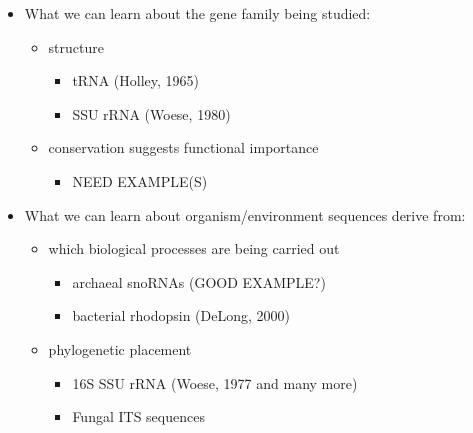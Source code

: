 \documentclass[landscape]{slides}
\begin{document}
\begin{slide}


\small
\begin{itemize}
\item What we can learn about the gene family being studied:
  \begin{itemize}
  \item structure
    \begin{itemize}
    \item tRNA (Holley, 1965)
    \item SSU rRNA (Woese, 1980)
    \end{itemize}
  \item conservation suggests functional importance
    \begin{itemize}
    \item NEED EXAMPLE(S)
    \end{itemize}
  \end{itemize}

\item What we can learn about organism/environment sequences derive
  from:
  \begin{itemize}
  \item which biological processes are being carried out
    \begin{itemize}
    \item archaeal snoRNAs (GOOD EXAMPLE?)
    \item bacterial rhodopsin (DeLong, 2000)
    \end{itemize}
  \item phylogenetic placement
    \begin{itemize}
    \item 16S SSU rRNA (Woese, 1977 and many more)
    \item Fungal ITS sequences
    \end{itemize}
  \end{itemize}
\end{itemize}

\vfill
\end{slide}
\end{document}
